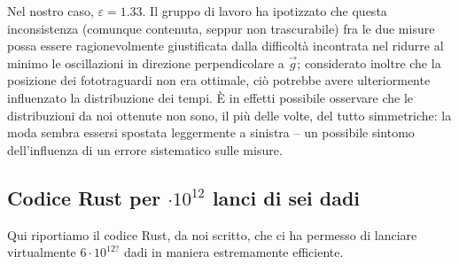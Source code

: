 \documentclass{article}
\begin{document}
Nel nostro caso, $\varepsilon = 1.33$. Il gruppo di lavoro ha ipotizzato che
questa inconsistenza (comunque contenuta, seppur non trascurabile) fra le due
misure possa essere ragionevolmente giustificata dalla difficoltà incontrata
nel ridurre al minimo le oscillazioni in direzione perpendicolare a $\vec{g}$;
considerato inoltre che la posizione dei fototraguardi non era ottimale, ciò
potrebbe avere ulteriormente influenzato la distribuzione dei tempi. È in
effetti possibile osservare che le distribuzioni da noi ottenute non sono,
il più delle volte, del tutto simmetriche: la moda sembra essersi spostata
leggermente a sinistra – un possibile sintomo dell'influenza di un
errore sistematico sulle misure.

\pagebreak
\begin{appendices}
    \section{Codice Rust per $\cdot10^{12}$ lanci di sei dadi}
    Qui riportiamo il codice Rust, da noi scritto, che ci ha permesso di
    lanciare virtualmente $6\cdot10^{12?}$ dadi in maniera estremamente
    efficiente.

    \inputminted[linenos, mathescape]{rust}{src/main.rs}
\end{appendices}
\end{document}
